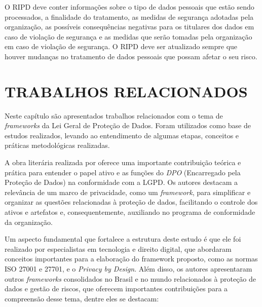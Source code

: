 \documentclass[
	12pt,				%
	openright,			%
	oneside,			%
	a4paper,			%
	english,			%
	french,				%
	spanish,			%
	brazil,				%
	]{abntex2}
\begin{document}
O RIPD deve conter informações sobre o tipo de dados pessoais que estão sendo processados, a finalidade do tratamento, as medidas de segurança adotadas pela organização, as possíveis consequências negativas para os titulares dos dados em caso de violação de segurança e as medidas que serão tomadas pela organização em caso de violação de segurança. O RIPD deve ser atualizado sempre que houver mudanças no tratamento de dados pessoais que possam afetar o seu risco.


\chapter{TRABALHOS RELACIONADOS}
\label{ch: trabalhos relacionados}

Neste capítulo são apresentados trabalhos relacionados com o tema de \textit{frameworks} da Lei Geral de Proteção de Dados. Foram utilizados como base de estudos realizados, levando ao entendimento de algumas etapas, conceitos e práticas metodológicas realizadas.

A obra literária realizada por \cite{Blum2020} oferece uma importante contribuição teórica e prática para entender o papel ativo e as funções do \textit{DPO} (Encarregado pela Proteção de Dados) na conformidade com a LGPD. Os autores destacam a relevância de um marco de privacidade, como um \textit{framework}, para simplificar e organizar as questões relacionadas à proteção de dados, facilitando o controle dos ativos e artefatos e, consequentemente, auxiliando no programa de conformidade da organização.

Um aspecto fundamental que fortalece a estrutura deste estudo é que ele foi realizado por especialistas em tecnologia e direito digital, que abordaram conceitos importantes para a elaboração do framework proposto, como as normas ISO 27001 e 27701, e o \textit{Privacy by Design}. Além disso, os autores apresentaram outros \textit{frameworks} consolidados no Brasil e no mundo relacionados à proteção de dados e gestão de riscos, que oferecem importantes contribuições para a compreensão desse tema, dentre eles se destacam:
\end{document}
